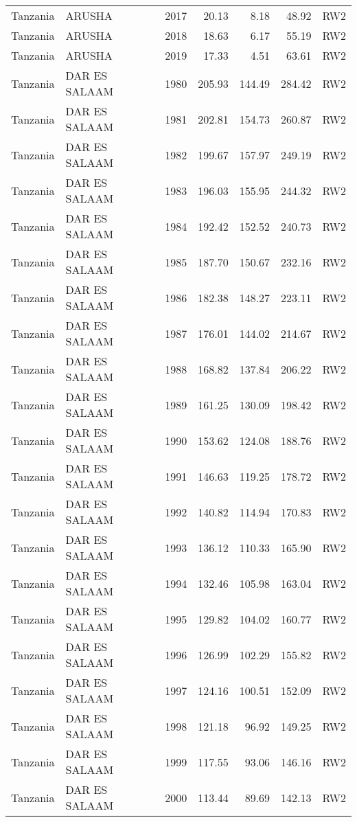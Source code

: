 \begin{longtable}{lllrrrl}
  Tanzania & ARUSHA & 2017 & 20.13 & 8.18 & 48.92 & RW2 \\ 
  Tanzania & ARUSHA & 2018 & 18.63 & 6.17 & 55.19 & RW2 \\ 
  Tanzania & ARUSHA & 2019 & 17.33 & 4.51 & 63.61 & RW2 \\ 
  Tanzania & DAR ES SALAAM & 1980 & 205.93 & 144.49 & 284.42 & RW2 \\ 
  Tanzania & DAR ES SALAAM & 1981 & 202.81 & 154.73 & 260.87 & RW2 \\ 
  Tanzania & DAR ES SALAAM & 1982 & 199.67 & 157.97 & 249.19 & RW2 \\ 
  Tanzania & DAR ES SALAAM & 1983 & 196.03 & 155.95 & 244.32 & RW2 \\ 
  Tanzania & DAR ES SALAAM & 1984 & 192.42 & 152.52 & 240.73 & RW2 \\ 
  Tanzania & DAR ES SALAAM & 1985 & 187.70 & 150.67 & 232.16 & RW2 \\ 
  Tanzania & DAR ES SALAAM & 1986 & 182.38 & 148.27 & 223.11 & RW2 \\ 
  Tanzania & DAR ES SALAAM & 1987 & 176.01 & 144.02 & 214.67 & RW2 \\ 
  Tanzania & DAR ES SALAAM & 1988 & 168.82 & 137.84 & 206.22 & RW2 \\ 
  Tanzania & DAR ES SALAAM & 1989 & 161.25 & 130.09 & 198.42 & RW2 \\ 
  Tanzania & DAR ES SALAAM & 1990 & 153.62 & 124.08 & 188.76 & RW2 \\ 
  Tanzania & DAR ES SALAAM & 1991 & 146.63 & 119.25 & 178.72 & RW2 \\ 
  Tanzania & DAR ES SALAAM & 1992 & 140.82 & 114.94 & 170.83 & RW2 \\ 
  Tanzania & DAR ES SALAAM & 1993 & 136.12 & 110.33 & 165.90 & RW2 \\ 
  Tanzania & DAR ES SALAAM & 1994 & 132.46 & 105.98 & 163.04 & RW2 \\ 
  Tanzania & DAR ES SALAAM & 1995 & 129.82 & 104.02 & 160.77 & RW2 \\ 
  Tanzania & DAR ES SALAAM & 1996 & 126.99 & 102.29 & 155.82 & RW2 \\ 
  Tanzania & DAR ES SALAAM & 1997 & 124.16 & 100.51 & 152.09 & RW2 \\ 
  Tanzania & DAR ES SALAAM & 1998 & 121.18 & 96.92 & 149.25 & RW2 \\ 
  Tanzania & DAR ES SALAAM & 1999 & 117.55 & 93.06 & 146.16 & RW2 \\ 
  Tanzania & DAR ES SALAAM & 2000 & 113.44 & 89.69 & 142.13 & RW2 \\ 

\end{longtable}
